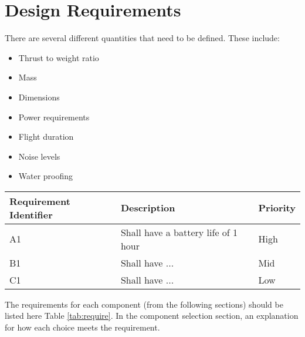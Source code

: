 \chapter{Design Requirements}
There are several different quantities that need to be defined. These include:
\begin{itemize}
	\setlength{\itemsep}{0pt}%
	\setlength{\parskip}{-6pt}%
	\item Thrust to weight ratio
	\item Mass
	\item Dimensions
	\item Power requirements
	\item Flight duration
	\item Noise levels
	\item Water proofing 
\end{itemize}

 
\begin{table*}[ht]
	\centering
	\caption[Design Requirements]{\bfseries{Design Requirements}}
	\label{tab:require}
	\vspace{5pt}
	\begin{tabularx}{\textwidth}{Xll}	
		\toprule[2pt]
		\textbf{Requirement Identifier} & \textbf{Description} & \textbf{Priority}\\
		\toprule[2pt]
		A1 & Shall have a battery life of 1 hour & High\\
		\hline
		B1 & Shall have ... & Mid\\
		\hline
		C1 & Shall have ... & Low\\
		\hline
	\end{tabularx}
\end{table*}

The requirements for each component (from the following sections) should be listed here Table \ref{tab:require}. In the component selection section, an explanation for how each choice meets the requirement.
